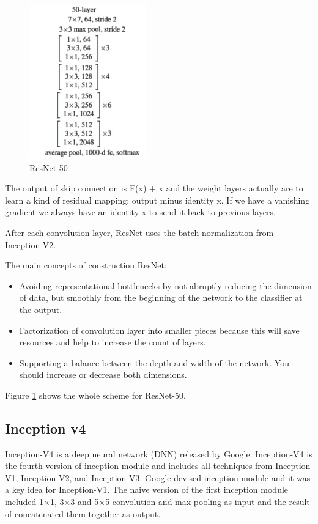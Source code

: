 \documentclass[titlepage]{report}
\begin{document}
\begin{figure}
\centering
\includegraphics[scale=0.85]{resnet_2}
\caption{ResNet-50}
\label{fig:resnet_50}
\end{figure}

The output of skip connection is  F(x) + x and the weight layers actually are to learn a kind of residual mapping: output minus identity x. If we have a vanishing gradient we always have an identity x to send it back to previous layers. 

After each convolution layer, ResNet uses the batch normalization from Inception-V2. 

The main concepts of construction ResNet:
\begin{itemize}
\item Avoiding representational bottlenecks by not abruptly reducing the dimension of data, but smoothly from the beginning of the network to the classifier at the output.
\item Factorization of convolution layer into smaller pieces because this will save resources and help to increase the count of layers.
\item Supporting a balance between the depth and width of the network. You should increase or decrease both dimensions.
\end{itemize}

Figure \ref{fig:resnet_50} shows the whole scheme for ResNet-50.

\subsection{Inception v4}
Inception-V4 is a deep neural network (DNN) released by Google. Inception-V4 is the fourth version of inception module and includes all techniques from Inception-V1, Inception-V2, and Inception-V3. Google devised inception module and it was a key idea for Inception-V1. The naive version of the first inception module included 1×1, 3×3 and 5×5 convolution and max-pooling as input and the result of concatenated them together as output. \\
\end{document}
